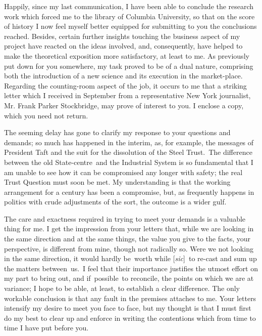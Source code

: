 \documentclass[twoside,symmetric,nobib,justified]{tufte-book}
\begin{document}
Happily, since my last communication, I have been able to conclude the
research work which forced me to the library of Columbia University, so
that on the score of history I now feel myself better equipped for
submitting to you the conclusions reached. Besides, certain further
insights touching the business aspect of my project have reacted on the
ideas involved, and, consequently, have helped to make the theoretical
exposition more satisfactory, at least to me. As previously put down for
you somewhere, my task proved to be of a dual nature, comprising both
the introduction of a new science and its execution in the market-place.
Regarding the counting-room aspect of the job, it occurs to me that a
striking letter which I received in September from a representative New
York journalist, Mr. Frank Parker Stockbridge, may prove of interest to
you. I enclose a copy, which you need not return.~

\newpage The seeming delay has gone to clarify my response to your questions and
demands; so much has happened in the interim, as, for example, the
messages of President Taft and the suit for the dissolution of the Steel
Trust.~The difference between the old State-centre~and the Industrial
System is so fundamental that I am unable to see how it can be
compromised any longer with safety; the real Trust Question must soon be
met. My understanding is that the working arrangement for a century has
been a compromise, but, as frequently happens in politics with crude
adjustments of the sort, the outcome is a wider gulf.~

The care and exactness required in trying to meet your demands is a
valuable thing for me. I get the impression from your letters that,
while we are looking in the same direction and at the same things, the
value you give to the facts, your perspective, is different from mine,
though not radically so. Were we not looking in the same direction, it
would hardly be~worth while {[}\emph{sic}{]}~to re-cast and sum up the
matters between~us.~I feel that their importance justifies the utmost
effort on my part to bring out, and if~possible~to reconcile, the points
on which we are at variance; I hope to be able, at least, to establish a
clear difference. The only workable conclusion is that any fault in the
premises attaches to me. Your letters intensify my desire to meet you
face to face, but my thought is that I must first do my best to clear up
and enforce in writing the contentions which from time to time I have
put before you.

\enlargethispage{\baselineskip}
\end{document}
